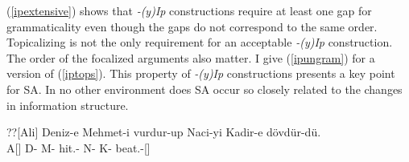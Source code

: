 (\ref{ipextensive}) shows that \textit{-(y)Ip} constructions require at least one gap for grammaticality even though the gaps do not correspond to the same order. Topicalizing is not the only requirement for an acceptable \textit{-(y)Ip} construction. The order of the focalized arguments also matter. I give (\ref{ipungram}) for a version of (\ref{iptops}). This property of \textit{-(y)Ip} constructions presents a key point for SA. In no other environment does SA occur so closely related to the changes in information structure. 

\begin{exe}
\ex \label{ipungram}
\gll ??[Ali] Deniz-e Mehmet-i vurdur-up Naci-yi Kadir-e dövdür-dü. \\ 
A[{\Nom}] D-{\Dat} M-{\Acc} hit.{\Caus}-{\Pc} N-{\Acc} K-{\Dat} beat.{\Caus}-{\Pst}[{\Tsg}] \\
\glt ${}$
\end{exe}



